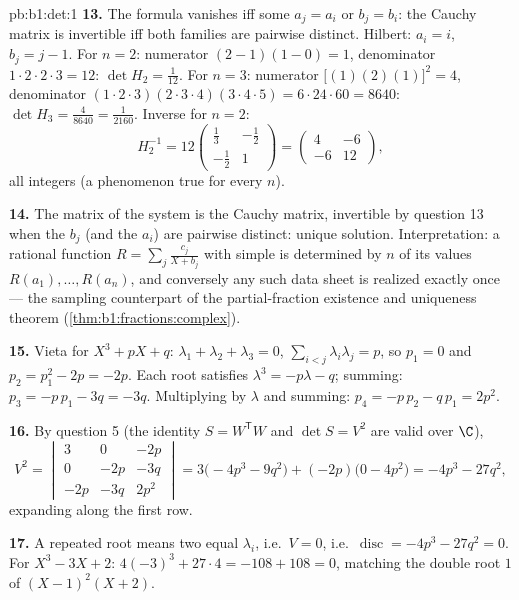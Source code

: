 \begin{solution}{pb:b1:det:1}
\textbf{13.} The formula vanishes iff some $a_j = a_i$ or $b_j =
b_i$: the Cauchy matrix is invertible iff both families are
pairwise distinct. Hilbert: $a_i = i$, $b_j = j - 1$. For $n =
2$: numerator $(2-1)(1-0) = 1$, denominator $1\cdot2\cdot2\cdot3
= 12$: $\det H_2 = \frac1{12}$. For $n = 3$: numerator
$\bigl[(1)(2)(1)\bigr]^2 = 4$, denominator $(1\cdot2\cdot3)
(2\cdot3\cdot4)(3\cdot4\cdot5) = 6\cdot24\cdot60 = 8640$:
$\det H_3 = \frac{4}{8640} = \frac1{2160}$. Inverse for $n = 2$:
\[
H_2^{-1} = 12\begin{pmatrix} \frac13 & -\frac12\\[2pt]
-\frac12 & 1\end{pmatrix}
= \begin{pmatrix} 4 & -6\\ -6 & 12 \end{pmatrix},
\]
all integers (a phenomenon true for every $n$).

\textbf{14.} The matrix of the system is the Cauchy matrix,
invertible by question 13 when the $b_j$ (and the $a_i$) are
pairwise distinct: unique solution. Interpretation: a rational
function $R = \sum_j \frac{c_j}{X + b_j}$ with simple  is
determined by $n$ of its values $R(a_1), \dots, R(a_n)$, and
conversely any such data sheet is realized exactly once ---
the sampling counterpart of the partial-fraction existence and
uniqueness theorem (\cref{thm:b1:fractions:complex}).

\textbf{15.} Vieta for $X^3 + pX + q$: $\lambda_1 + \lambda_2 +
\lambda_3 = 0$, $\sum_{i<j}\lambda_i\lambda_j = p$, so $p_1 = 0$
and $p_2 = p_1^2 - 2p = -2p$. Each root satisfies $\lambda^3 =
-p\lambda - q$; summing: $p_3 = -p\,p_1 - 3q = -3q$. Multiplying
by $\lambda$ and summing: $p_4 = -p\,p_2 - q\,p_1 = 2p^2$.

\textbf{16.} By question 5 (the identity $S = W^{\mathsf T}W$
and $\det S = V^2$ are valid over $\C$),
\[
V^2 = \begin{vmatrix}
3 & 0 & -2p\\
0 & -2p & -3q\\
-2p & -3q & 2p^2
\end{vmatrix}
= 3\bigl(-4p^3 - 9q^2\bigr) + (-2p)\bigl(0 - 4p^2\bigr)
= -4p^3 - 27q^2 ,
\]
expanding along the first row.

\textbf{17.} A repeated root means two equal $\lambda_i$, i.e.\
$V = 0$, i.e.\ $\operatorname{disc} = -4p^3 - 27q^2 = 0$. For
$X^3 - 3X + 2$: $4(-3)^3 + 27\cdot4 = -108 + 108 = 0$, matching
the double root $1$ of $(X-1)^2(X+2)$.


\end{solution}
